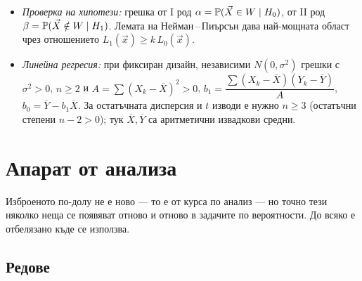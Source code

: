 \begin{itemize}
        \emph{два различни} квантила, защото $\chi^2$ не е симетрично.
  \item \emph{Проверка на хипотези:} грешка от I род $\alpha = \mathbb{P}(\vec X \in W \mid H_0)$,
        от II род $\beta = \mathbb{P}(\vec X \notin W \mid H_1)$. Лемата на
        Нейман\,--\,Пиърсън дава най-мощната област чрез отношението
        $L_1(\vec x) \ge k\,L_0(\vec x)$.
  \item \emph{Линейна регресия:} при фиксиран дизайн, независими
        $N(0,\sigma^2)$ грешки с $\sigma^2>0$, $n\ge2$ и
        $A=\sum (X_k-\overline X)^2>0$,
        $b_1 = \dfrac{\sum (X_k-\overline X)(Y_k-\overline Y)}{A}$,\;
        $b_0 = \overline Y - b_1 \overline X$. За остатъчната дисперсия и $t$
        изводи е нужно $n\ge3$ (остатъчни степени $n-2>0$); тук
        $\overline X,\overline Y$ са аритметични извадкови средни.
\end{itemize}

\section{Апарат от анализа}

Изброеното по-долу не е ново — то е от курса по анализ — но точно тези няколко неща се
появяват отново и отново в задачите по вероятности. До всяко е отбелязано къде се използва.

\subsection*{Редове}

